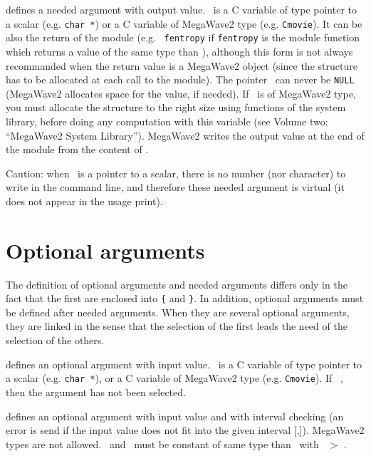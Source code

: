 \Liste{\Tid\  \Larrow \Cid}
defines a needed argument with output value.
\Cid\ is a C variable of type pointer to a scalar (e.g. \verb+char *+)
or a C variable of MegaWave2 type (e.g. \verb+Cmovie+).
It can be also the return of the module (e.g. \Tid\ \Larrow \verb+fentropy+
if \verb+fentropy+ is the module function which returns a value of the same type than \Cid),
although this form is not always recommanded when the return value is a
MegaWave2 object (since the structure has to be allocated at each call to
the module). 
The pointer \Cid\ can never be \verb+NULL+ (MegaWave2 allocates space for the
value, if needed).
If \Cid\ is of MegaWave2 type, you must allocate the
structure to the right size using functions of the system library,
before doing any computation with this variable (see Volume two: ``MegaWave2 System Library'').
MegaWave2 writes the output value at the end of the module
from the content of \ACid.

Caution: when \Cid\ is a pointer to a scalar, there is no number (nor character) to write in the command line, and therefore these needed argument is virtual
(it does not appear in the usage print).

\section{Optional arguments}
\label{header_optional-arg}

The definition of optional arguments and needed arguments differs only
in the fact that the first are enclosed into \verb+{+ and \verb+}+.
In addition, optional arguments must be defined after needed arguments.
When they are several optional arguments, they are linked in the sense
that the selection of the first leads the need of the selection of the others.

\Liste{\Tid\  \Rarrow \Cid} 
defines an optional argument with input value.
\Cid\ is a C variable of type pointer to a scalar (e.g. \verb+char *+),
or a C variable of MegaWave2 type (e.g. \verb+Cmovie+).
If \Cid\ \ENULL, then the argument has not been selected.

\Liste{\Tid\  \Rarrow \Cid\  [\Min,\Max]} 
defines an optional argument with input value and with interval checking 
(an error is send if the input value does not fit into the given interval [\Min,\Max]).
MegaWave2 types are not allowed.
\Min\ and \Max\ must be constant of same type than \Cid\ with \Max\ $>$ \Min.

